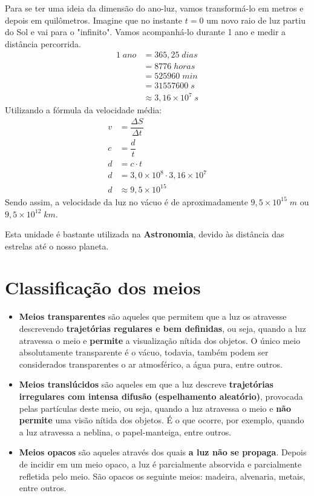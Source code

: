 \documentclass[11pt,twocolumn,oneside]{article}
\begin{document}
Para se ter uma ideia da dimensão do ano-luz, vamos transformá-lo em metros e depois em quilômetros. Imagine que no instante $t=0$ um novo raio de luz partiu do Sol e vai para o "infinito". Vamos acompanhá-lo durante 1 ano e medir a distância percorrida.
\begin{align*}
    1\;ano  &= 365,25\;dias \\
            &= 8776\;horas \\
            &= 525960\;min \\
            &= 31557600\;s \\
            &\approx 3,16\times 10^{7}\;s
\end{align*}
Utilizando a fórmula da velocidade média:
\begin{align*}
    v &= \dfrac{\Delta S}{\Delta t} \\
    c &= \dfrac{d}{t} \\
    d &= c \cdot t \\
    d &= 3,0\times 10^{8} \cdot 3,16\times 10^{7} \\
    d &\approx 9,5 \times 10^{15}
\end{align*}
Sendo assim, a velocidade da luz no vácuo é de aproximadamente $9,5\times 10^{15}\;m$ ou $9,5\times 10^{12}\;km$.


Esta unidade é bastante utilizada na \textbf{Astronomia}, devido às distância das estrelas até o nosso planeta.


\hypertarget{x-classificação-dos-meios}{\section{Classificação dos meios}}
\begin{itemize}

\item \textbf{Meios transparentes} são aqueles que permitem que a luz os atravesse descrevendo \textbf{trajetórias regulares e bem definidas}, ou seja, quando a luz atravessa o meio  e \textbf{permite} a visualização nítida dos objetos. O único meio absolutamente transparente é o vácuo, todavia, também podem ser considerados transparentes o ar atmosférico, a água pura, entre outros.

\item \textbf{Meios translúcidos} são aqueles em que a luz descreve \textbf{trajetórias irregulares com intensa difusão (espelhamento aleatório)}, provocada pelas partículas deste meio, ou seja, quando a luz atravessa o meio e \textbf{não permite} uma visão nítida dos objetos. É o que ocorre, por exemplo, quando a luz atravessa a neblina, o papel-manteiga, entre outros.

\item \textbf{Meios opacos} são aqueles através dos quais \textbf{a luz não se propaga}. Depois de incidir em um meio opaco, a luz é parcialmente absorvida e parcialmente refletida pelo meio. São opacos os seguinte meios: madeira, alvenaria, metais, entre outros.

\end{itemize}
\end{document}
